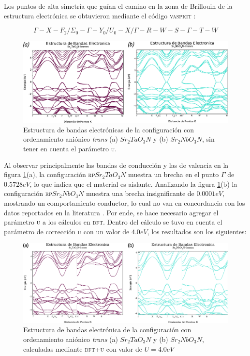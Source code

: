 Los puntos de alta simetría que guían el camino en la zona de Brillouin de la estructura electrónica se obtuvieron mediante el código \textsc{vaspkit} \cite{Wang2019VASPKITCode}:

$$\Gamma-X-F_{2}/\Sigma_{0}-\Gamma-Y_{0}/U_{0}-X/\Gamma-R-W-S-\Gamma-T-W$$

\begin{figure}[H]
    \centering
    \includegraphics[width=\textwidth]{Figs/bands-trans_sin-U.eps}
    \caption{Estructura de bandas electrónicas de la configuración con ordenamiento aniónico \emph{trans}  (a) $Sr_{2}TaO_{3}N$ y (b) $Sr_{2}NbO_{3}N$, sin tener en cuenta el parámetro \textsc{u}.}
    \label{Fig. bandas_trans-sin-u}
\end{figure}

Al observar principalmente las bandas de conducción y las de valencia en la figura \ref{Fig. bandas_trans-sin-u}(a), la configuración \textsc{rp}$Sr_{2}TaO_{3}N$  muestra un brecha en el punto $\Gamma$ de $0.5728 eV$, lo que indica que el material es aislante. Analizando la figura \ref{Fig. bandas_trans-sin-u}(b) la configuración \textsc{rp}$Sr_{2}NbO_{3}N$ muestra una brecha insignificante de $0.0001 eV$, mostrando un comportamiento conductor, lo cual no van en concordancia con los datos reportados en la literatura \cite{Diot1999CrystalN,Bouri2018}. Por ende, se hace necesario agregar el parámetro \textsc{u} a los cálculos en \textsc{dft}. Dentro del cálculo se tuvo en cuenta el parámetro de corrección \textsc{u} con un valor de $4.0  eV$, los resultados son los siguientes:

\begin{figure}[H]
    \centering
    \includegraphics[width=\textwidth]{Figs/bands-con-u_trans.png}
    \caption{Estructura de bandas electrónica de la configuración con ordenamiento aniónico \emph{trans}  (a) $Sr_{2}TaO_{3}N$ y (b) $Sr_{2}NbO_{3}N$, calculadas mediante \textsc{dft+u} con valor de $U=4.0  eV$}
    \label{Fig. bands-con-u_trans}
\end{figure}

